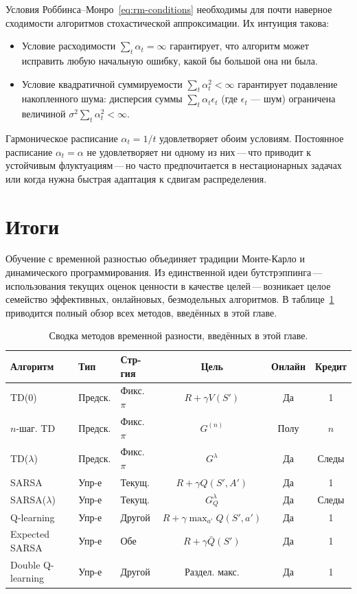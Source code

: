 Условия Роббинса--Монро~\eqref{eq:rm-conditions} необходимы для почти наверное сходимости алгоритмов стохастической аппроксимации.  Их интуиция такова:
\begin{itemize}[leftmargin=*]
  \item Условие расходимости $\sum_t\alpha_t = \infty$ гарантирует, что алгоритм может исправить любую начальную ошибку, какой бы большой она ни была.
  \item Условие квадратичной суммируемости $\sum_t\alpha_t^2 < \infty$ гарантирует подавление накопленного шума: дисперсия суммы $\sum_t\alpha_t\epsilon_t$ (где $\epsilon_t$ --- шум) ограничена величиной $\sigma^2\sum_t\alpha_t^2 < \infty$.
\end{itemize}
Гармоническое расписание $\alpha_t = 1/t$ удовлетворяет обоим условиям.  Постоянное расписание $\alpha_t = \alpha$ не удовлетворяет ни одному из них\,---\,что приводит к устойчивым флуктуациям\,---\,но часто предпочитается в нестационарных задачах или когда нужна быстрая адаптация к сдвигам распределения.

\section{Итоги}
\label{sec:td-summary}

Обучение с временной разностью объединяет традиции Монте-Карло и динамического программирования.  Из единственной идеи бутстрэппинга\,---\,использования текущих оценок ценности в качестве целей\,---\,возникает целое семейство эффективных, онлайновых, безмодельных алгоритмов.  В таблице~\ref{tab:td-summary} приводится полный обзор всех методов, введённых в этой главе.

\begin{table}[ht]
\centering
\caption{Сводка методов временной разности, введённых в этой главе.}
\label{tab:td-summary}
\footnotesize
\begin{tabular}{@{}lllccc@{}}
\toprule
\textbf{Алгоритм} & \textbf{Тип} & \textbf{Стр-гия} & \textbf{Цель} & \textbf{Онлайн} & \textbf{Кредит}\\
\midrule
TD(0) & Предск. & Фикс. $\pi$ & $R+\gamma V(S')$ & Да & 1\\
$n$-шаг. TD & Предск. & Фикс. $\pi$ & $G^{(n)}$ & Полу & $n$\\
TD($\lambda$) & Предск. & Фикс. $\pi$ & $G^\lambda$ & Да & Следы\\
SARSA & Упр-е & Текущ. & $R+\gamma Q(S',A')$ & Да & 1\\
SARSA($\lambda$) & Упр-е & Текущ. & $G^\lambda_Q$ & Да & Следы\\
Q-learning & Упр-е & Другой & $R+\gamma\max_{a'}Q(S',a')$ & Да & 1\\
Expected SARSA & Упр-е & Обе & $R+\gamma\bar Q(S')$ & Да & 1\\
Double Q-learning & Упр-е & Другой & Раздел. макс. & Да & 1\\
\bottomrule
\end{tabular}
\end{table}

